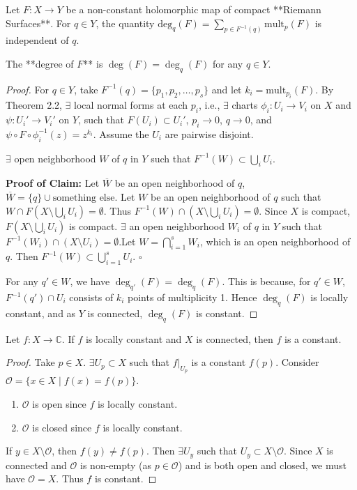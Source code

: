 \documentclass{article}
\begin{document}
\begin{theorem} \label{degree of holo map between copt rs}
Let $F: X \to Y$ be a non-constant holomorphic map of compact **Riemann Surfaces**.
For $q \in Y$, the quantity $\text{deg}_q(F) = \sum_{p \in F^{-1}(q)} \text{mult}_p(F)$ is independent of $q$.
\end{theorem}

\begin{definition}
The **degree of $F$** is $\deg(F) = \deg_q(F)$ for any $q \in Y$.
\end{definition}

\begin{proof}
For $q \in Y$, take $F^{-1}(q) = \{p_1, p_2, \dots, p_s\}$ and let $k_i = \text{mult}_{p_i}(F)$.
By Theorem 2.2, $\exists$ local normal forms at each $p_i$, i.e.,
$\exists$ charts $\phi_i: U_i \to V_i$ on $X$ and $\psi: U_i' \to V_i'$ on $Y$,
such that $F(U_i) \subset U_i'$, $p_i \to 0$, $q \to 0$,
and $\psi \circ F \circ \phi_i^{-1}(z) = z^{k_i}$. Assume the $U_i$ are pairwise disjoint.
\begin{claim*}
$\exists$ open neighborhood $W$ of $q$ in $Y$ such that $F^{-1}(W) \subset \bigcup_{i} U_i$.
\end{claim*}
\textbf{Proof of Claim:}
Let $\overline{W}$ be an open neighborhood of $q$, $\overline{W} = \{q\} \cup \text{something else}$.
Let $W$ be an open neighborhood of $q$ such that $W \cap F(X \setminus \bigcup_i U_i) = \emptyset$.
Thus $F^{-1}(W) \cap (X \setminus \bigcup_i U_i) = \emptyset$.
Since $X$ is compact, $F(X \setminus \bigcup_i U_i)$ is compact.
$\exists$ an open neighborhood $W_i$ of $q$ in $Y$ such that $F^{-1}(W_i) \cap (X \setminus U_i) = \emptyset$.Let $W = \bigcap_{i=1}^s W_i$, which is an open neighborhood of $q$. Then $F^{-1}(W) \subset \bigcup_{i=1}^s U_i$. $\square$

For any $q' \in W$, we have $\deg_{q'}(F) = \deg_q(F)$.
This is because, for $q' \in W$, $F^{-1}(q') \cap U_i$ consists of $k_i$ points of multiplicity 1.
Hence $\deg_q(F)$ is locally constant, and as $Y$ is connected, $\deg_q(F)$ is constant.
\end{proof}

\begin{remark}
Let $f: X \to \mathbb{C}$. If $f$ is locally constant and $X$ is connected,
then $f$ is a constant.
\end{remark}

\begin{proof}
Take $p \in X$. $\exists U_p \subset X$ such that $f|_{U_p}$ is a constant $f(p)$.
Consider $\mathcal{O} = \{x \in X \mid f(x) = f(p)\}$.
\begin{enumerate}
    \item $\mathcal{O}$ is open since $f$ is locally constant.
    \item $\mathcal{O}$ is closed since $f$ is locally constant.
\end{enumerate}
If $y \in X \setminus \mathcal{O}$, then $f(y) \neq f(p)$. Then $\exists U_y$ such that $U_y \subset X \setminus \mathcal{O}$.
Since $X$ is connected and $\mathcal{O}$ is non-empty (as $p \in \mathcal{O}$) and is both open and closed, we must have $\mathcal{O} = X$.
Thus $f$ is constant.
\end{proof}
\end{document}
